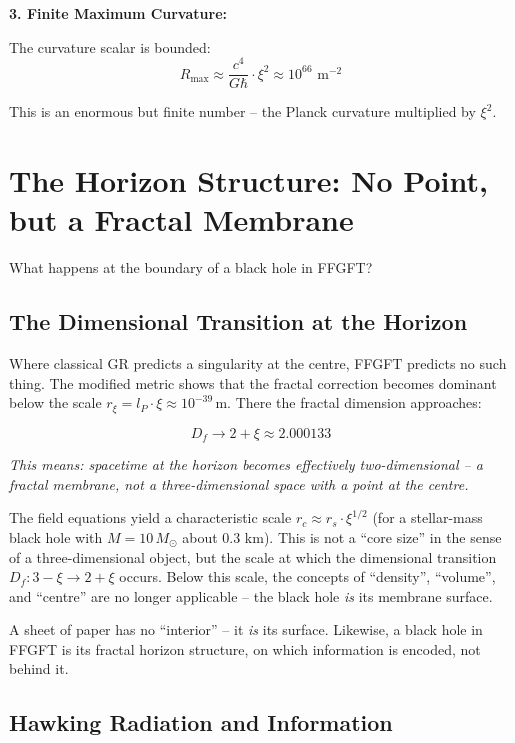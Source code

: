 \textbf{3. Finite Maximum Curvature:}

The curvature scalar is bounded:
\begin{equation}
R_{\text{max}} \approx \frac{c^4}{G\hbar} \cdot \xi^2 \approx 10^{66} \text{ m}^{-2}
\end{equation}

This is an enormous but finite number -- the Planck curvature multiplied by $\xi^2$.

\section{The Horizon Structure: No Point, but a Fractal Membrane}

What happens at the boundary of a black hole in FFGFT?

\subsection{The Dimensional Transition at the Horizon}

Where classical GR predicts a singularity at the centre, FFGFT predicts no such thing. The modified metric shows that the fractal correction becomes dominant below the scale $r_\xi = l_P \cdot \xi \approx 10^{-39}\,$m. There the fractal dimension approaches:

\begin{equation}
	D_f \to 2 + \xi \approx 2.000133
\end{equation}

\textit{This means: spacetime at the horizon becomes effectively two-dimensional -- a fractal membrane, not a three-dimensional space with a point at the centre.}

The field equations yield a characteristic scale $r_c \approx r_s \cdot \xi^{1/2}$ (for a stellar-mass black hole with $M = 10\, M_\odot$ about 0.3 km). This is not a ``core size'' in the sense of a three-dimensional object, but the scale at which the dimensional transition $D_f: 3 - \xi \to 2 + \xi$ occurs. Below this scale, the concepts of ``density'', ``volume'', and ``centre'' are no longer applicable -- the black hole \textit{is} its membrane surface.

A sheet of paper has no ``interior'' -- it \textit{is} its surface. Likewise, a black hole in FFGFT is its fractal horizon structure, on which information is encoded, not behind it.

\subsection{Hawking Radiation and Information}

